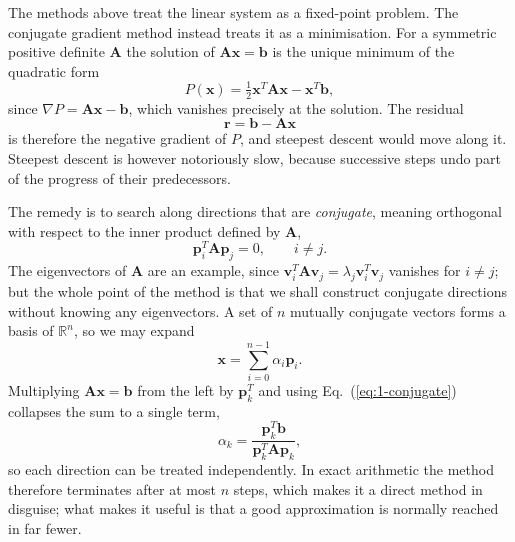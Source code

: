 The methods above treat the linear system as a fixed-point problem.  The
conjugate gradient method instead treats it as a minimisation.  For a
symmetric positive definite $\bm{A}$ the solution of $\bm{A}\bm{x}=\bm{b}$ is
the unique minimum of the quadratic form
\begin{equation}
  P(\bm{x}) = \tfrac{1}{2}\bm{x}^{T}\bm{A}\bm{x} - \bm{x}^{T}\bm{b},
  \label{eq:1-quadform}
\end{equation}
since $\nabla P = \bm{A}\bm{x}-\bm{b}$, which vanishes precisely at the
solution.  The residual
\begin{equation}
  \bm{r} = \bm{b} - \bm{A}\bm{x}
  \label{eq:1-residual}
\end{equation}
is therefore the negative gradient of $P$, and steepest descent would move
along it.  Steepest descent is however notoriously slow, because successive
steps undo part of the progress of their predecessors.

The remedy is to search along directions that are \emph{conjugate}, meaning
orthogonal with respect to the inner product defined by $\bm{A}$,
\begin{equation}
  \bm{p}_i^{T}\bm{A}\bm{p}_j = 0, \qquad i\ne j .
  \label{eq:1-conjugate}
\end{equation}
The eigenvectors of $\bm{A}$ are an example, since
$\bm{v}_i^{T}\bm{A}\bm{v}_j=\lambda_j\bm{v}_i^{T}\bm{v}_j$ vanishes for $i\ne
j$; but the whole point of the method is that we shall construct conjugate
directions without knowing any eigenvectors.  A set of $n$ mutually conjugate
vectors forms a basis of $\mathbb{R}^n$, so we may expand
\begin{equation}
  \bm{x} = \sum_{i=0}^{n-1}\alpha_i\bm{p}_i .
  \label{eq:1-cgexpand}
\end{equation}
Multiplying $\bm{A}\bm{x}=\bm{b}$ from the left by $\bm{p}_k^{T}$ and using
Eq.~(\ref{eq:1-conjugate}) collapses the sum to a single term,
\begin{equation}
  \alpha_k = \frac{\bm{p}_k^{T}\bm{b}}{\bm{p}_k^{T}\bm{A}\bm{p}_k},
  \label{eq:1-cgalpha}
\end{equation}
so each direction can be treated independently.  In exact arithmetic the
method therefore terminates after at most $n$ steps, which makes it a direct
method in disguise; what makes it useful is that a good approximation is
normally reached in far fewer.


